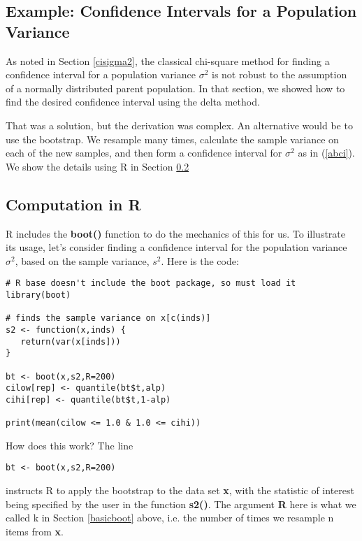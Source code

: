 \subsection{Example:  Confidence Intervals for a Population Variance}

As noted in Section \ref{cisigma2}, the classical chi-square method for
finding a confidence interval for a population variance $\sigma^2$ is
not robust to the assumption of a normally distributed parent
population.  In that section, we showed how to find the desired
confidence interval using the delta method.

That was a solution, but the derivation was complex.  An alternative
would be to use the bootstrap.  We resample many times, calculate the
sample variance on each of the new samples, and then form a confidence
interval for $\sigma^2$ as in (\ref{abci}).  We show the details using R
in Section \ref{compinr}

\subsection{Computation in R}
\label{compinr}

R includes the {\bf boot()} function to do the mechanics of this for us.
To illustrate its usage, let's consider finding a confidence interval
for the population variance $\sigma^2$, based on the sample variance,
$s^2$.  Here is the code:

\begin{Verbatim}[fontsize=\relsize{-2}]
# R base doesn't include the boot package, so must load it
library(boot)  

# finds the sample variance on x[c(inds)]
s2 <- function(x,inds) {
   return(var(x[inds]))
}

bt <- boot(x,s2,R=200)
cilow[rep] <- quantile(bt$t,alp)
cihi[rep] <- quantile(bt$t,1-alp)

print(mean(cilow <= 1.0 & 1.0 <= cihi))
\end{Verbatim}

How does this work?  The line

\begin{Verbatim}[fontsize=\relsize{-2}]
bt <- boot(x,s2,R=200)
\end{Verbatim}

instructs R to apply the bootstrap to the data set {\bf x}, with the
statistic of interest being specified by the user in the function {\bf
s2()}.  The argument {\bf R} here is what we called k in Section
\ref{basicboot} above, i.e. the number of times we resample n items from
{\bf x}.

